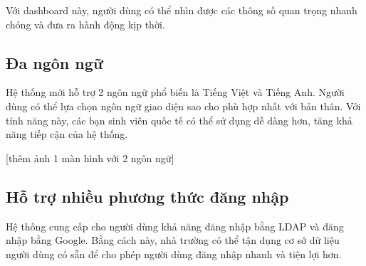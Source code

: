 \documentclass[./../main.tex]{subfiles}
\begin{document}
Với dashboard này, người dùng có thể nhìn được các thông số quan trọng
nhanh chóng và đưa ra hành động kịp thời.

\hypertarget{ux111a-nguxf4n-ngux1eef-1}{%
\subsection{Đa ngôn ngữ}\label{ux111a-nguxf4n-ngux1eef-1}}

Hệ thống mới hỗ trợ 2 ngôn ngữ phổ biến là Tiếng Việt và Tiếng Anh.
Người dùng có thể lựa chọn ngôn ngữ giao diện sao cho phù hợp nhất với
bản thân. Với tính năng này, các bạn sinh viên quốc tế có thể sử dụng dễ
dàng hơn, tăng khả năng tiếp cận của hệ thống.

{[}thêm ảnh 1 màn hình với 2 ngôn ngữ{]}

\hypertarget{hux1ed7-trux1ee3-nhiux1ec1u-phux1b0ux1a1ng-thux1ee9c-ux111ux103ng-nhux1eadp}{%
\subsection{Hỗ trợ nhiều phương thức đăng
nhập}\label{hux1ed7-trux1ee3-nhiux1ec1u-phux1b0ux1a1ng-thux1ee9c-ux111ux103ng-nhux1eadp}}

Hệ thống cung cấp cho người dùng khả năng đăng nhập bằng LDAP và đăng
nhập bằng Google. Bằng cách này, nhà trường có thể tận dụng cơ sở dữ
liệu người dùng có sẵn để cho phép người dùng đăng nhập nhanh và tiện
lợi hơn.
\end{document}
